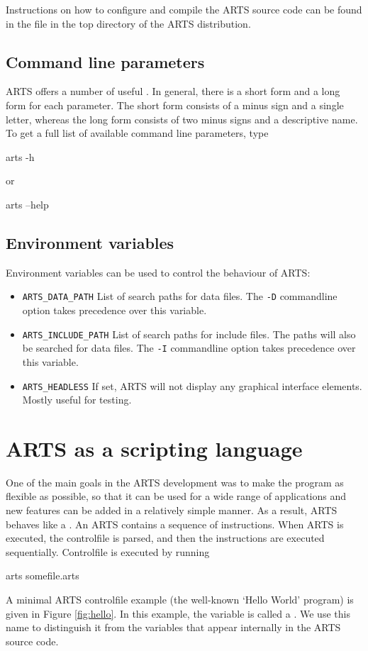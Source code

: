 Instructions on how to configure and compile the ARTS source code can
be found in the file  in the top directory of the
ARTS distribution.

\subsection{Command line parameters}

ARTS offers a number of useful . In
general, there is a short form and a long form for each parameter. The
short form consists of a minus sign and a single letter, whereas the
long form consists of two minus signs and a descriptive name. To get a
full list of available command line parameters, type
\begin{code}
  arts -h
\end{code}
or
\begin{code}
  arts --help
\end{code}

\subsection{Environment variables}

Environment variables can be used to control the behaviour of ARTS:

\begin{itemize}
\item \verb|ARTS_DATA_PATH|
List of search paths for data files. The \verb|-D| commandline option
takes precedence over this variable.
\item \verb|ARTS_INCLUDE_PATH|
List of search paths for include files. The paths will also be
searched for data files. The \verb|-I| commandline option takes
precedence over this variable.
\item \verb|ARTS_HEADLESS|
If set, ARTS will not display any graphical interface elements. Mostly
useful for testing.
\end{itemize}

\section{ARTS as a scripting language}

One of the main goals in the ARTS development was to make the program
as flexible as possible, so that it can be used for a wide range of
applications and new features can be added in a relatively simple
manner. As a result, ARTS behaves like a . An ARTS  contains a sequence of
instructions. When ARTS is executed, the controlfile is parsed, and
then the instructions are executed sequentially. Controlfile
 is executed by running
\begin{code}
  arts somefile.arts
\end{code}
A minimal ARTS controlfile example (the well-known `Hello World' program) is
given in Figure \ref{fig:hello}. In this example, the variable  is
called a \emph{}. We use this name to distinguish
it from the variables that appear internally in the ARTS source code.

